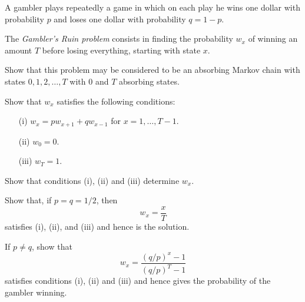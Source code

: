 \documentclass[12pt]{exam}
\begin{document}
\begin{questions}
\question[20]
A gambler plays repeatedly a game in which on each play he wins one dollar with probability $p$ and loses one dollar with probability $q=1-p$. 

The \emph{Gambler's Ruin problem} consists in finding the probability $w_x$ of winning an amount $T$ before losing everything, starting with state $x$. 
\begin{parts}
\item Show that this problem may be considered to be an absorbing Markov chain with states $0,1,2,\ldots,T$ with $0$ and $T$ absorbing states.
\item Show that $w_x$ satisfies the following conditions:
\begin{itemize}
\item[(i)] $w_x = pw_{x+1} + qw_{x-1}$ for $x=1,\ldots,T-1$.
\item[(ii)] $w_0 = 0$.
\item[(iii)] $w_T = 1$.
\end{itemize}
\item Show that conditions (i), (ii) and (iii) determine $w_x$.
\item Show that, if $p=q=1/2$, then
\[
w_x = \frac xT
\]
satisfies (i), (ii), and (iii) and hence is the solution. 
\item If $p\neq q$, show that
\[
w_x=\frac{(q/p)^x-1}{(q/p)^T-1}
\]
satisfies conditions (i), (ii) and (iii) and hence gives the probability of the gambler winning.
\end{parts}

 


\end{questions}
\end{document}
